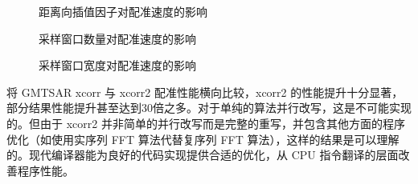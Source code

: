 \begin{figure}[htbp]
\centering
\subfloat[程序计算时间]{
    \label{fig:exp_ri_a}
    \begin{minipage}[t]{0.49\textwidth}
        \centering
        \resizebox {\textwidth} {!} {
            
        }
    \end{minipage}
}
\caption{距离向插值因子对配准速度的影响} \label{fig:exp_ri}
\end{figure}

\begin{figure}[htbp]
\centering
\subfloat[程序计算时间]{
    \label{fig:exp_ri_a}
    \begin{minipage}[t]{0.49\textwidth}
        \centering
        \resizebox {\textwidth} {!} {
            
        }
    \end{minipage}
}
\caption{采样窗口数量对配准速度的影响} \label{fig:exp_ri}
\end{figure}

\begin{figure}[htbp]
\centering
\subfloat[程序计算时间]{
    \label{fig:exp_nxy_a}
    \begin{minipage}[t]{0.49\textwidth}
        \centering
        \resizebox {\textwidth} {!} {
            
        }
    \end{minipage}
}
\caption{采样窗口宽度对配准速度的影响} \label{fig:exp_ri}
\end{figure}


将 GMTSAR xcorr 与 xcorr2 配准性能横向比较，xcorr2 的性能提升十分显著，部分结果性能提升甚至达到30倍之多。对于单纯的算法并行改写，这是不可能实现的。但由于 xcorr2 并非简单的并行改写而是完整的重写，并包含其他方面的程序优化（如使用实序列 FFT 算法代替复序列 FFT 算法），这样的结果是可以理解的。现代编译器能为良好的代码实现提供合适的优化，从 CPU 指令翻译的层面改善程序性能。

